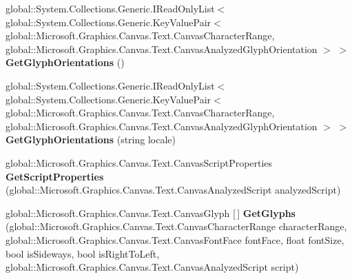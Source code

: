 \begin{DoxyCompactItemize}
global\+::\+System.\+Collections.\+Generic.\+I\+Read\+Only\+List$<$ global\+::\+System.\+Collections.\+Generic.\+Key\+Value\+Pair$<$ global\+::\+Microsoft.\+Graphics.\+Canvas.\+Text.\+Canvas\+Character\+Range, global\+::\+Microsoft.\+Graphics.\+Canvas.\+Text.\+Canvas\+Analyzed\+Glyph\+Orientation $>$ $>$ {\bfseries Get\+Glyph\+Orientations} ()
\item 
\mbox{\label{class_microsoft_1_1_graphics_1_1_canvas_1_1_text_1_1_canvas_text_analyzer_a5d9bd343724b86e778507b295082ef00}} 
global\+::\+System.\+Collections.\+Generic.\+I\+Read\+Only\+List$<$ global\+::\+System.\+Collections.\+Generic.\+Key\+Value\+Pair$<$ global\+::\+Microsoft.\+Graphics.\+Canvas.\+Text.\+Canvas\+Character\+Range, global\+::\+Microsoft.\+Graphics.\+Canvas.\+Text.\+Canvas\+Analyzed\+Glyph\+Orientation $>$ $>$ {\bfseries Get\+Glyph\+Orientations} (string locale)
\item 
\mbox{\label{class_microsoft_1_1_graphics_1_1_canvas_1_1_text_1_1_canvas_text_analyzer_a523f4325687e72e2b6f23ffbf0876b73}} 
global\+::\+Microsoft.\+Graphics.\+Canvas.\+Text.\+Canvas\+Script\+Properties {\bfseries Get\+Script\+Properties} (global\+::\+Microsoft.\+Graphics.\+Canvas.\+Text.\+Canvas\+Analyzed\+Script analyzed\+Script)
\item 
\mbox{\label{class_microsoft_1_1_graphics_1_1_canvas_1_1_text_1_1_canvas_text_analyzer_ac117d4010da0dcaf5afcc757320c6f8f}} 
global\+::\+Microsoft.\+Graphics.\+Canvas.\+Text.\+Canvas\+Glyph \mbox{[}$\,$\mbox{]} {\bfseries Get\+Glyphs} (global\+::\+Microsoft.\+Graphics.\+Canvas.\+Text.\+Canvas\+Character\+Range character\+Range, global\+::\+Microsoft.\+Graphics.\+Canvas.\+Text.\+Canvas\+Font\+Face font\+Face, float font\+Size, bool is\+Sideways, bool is\+Right\+To\+Left, global\+::\+Microsoft.\+Graphics.\+Canvas.\+Text.\+Canvas\+Analyzed\+Script script)
\item 
\mbox{\label{class_microsoft_1_1_graphics_1_1_canvas_1_1_text_1_1_canvas_text_analyzer_a96ffee25bbe4a0df427e23a2c2493f0b}} 

\end{DoxyCompactItemize}
